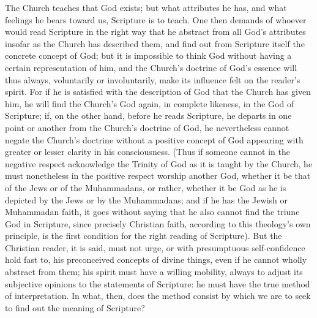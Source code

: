\documentclass[12pt]{book}
\newcommand{\opage}[1]{\marginnote{\footnotesize\textit{[#1]}}}
\begin{document}
The Church teaches that God exists; but what attributes he has, and what
feelings he bears toward us, Scripture is to teach. One then demands of whoever
would read Scripture in the right way that he abstract from all God's
attributes insofar as the Church has described them, and find out from
Scripture itself the concrete concept of God; but it is impossible to think God
without having a certain representation of him, and the Church's doctrine of
God's essence will thus always, voluntarily or involuntarily, make its
influence felt on the reader's spirit.
\opage{108} For if he is satisfied with the description of God that the Church
has given him, he will find the Church's God again, in complete likeness, in
the God of Scripture; if, on the other hand, before he reads Scripture, he
departs in one point or another from the Church's doctrine of God, he
nevertheless cannot negate the Church's doctrine without a positive concept of
God appearing with greater or lesser clarity in his consciousness. (Thus if
someone cannot in the negative respect acknowledge the Trinity of God as it is
taught by the Church, he must nonetheless in the positive respect worship
another God, whether it be that of the Jews or of the Muhammadans, or rather,
whether it be God as he is depicted by the Jews or by the Muhammadans; and if
he has the Jewish or Muhammadan faith, it goes without saying that he also
cannot find the triune God in Scripture, since precisely Christian faith,
according to this theology's own principle, is the first condition for the
right reading of Scripture). But the Christian reader, it is said, must not
urge, or with presumptuous self-confidence hold fast to, his preconceived
concepts of divine things, even if he cannot wholly abstract from them; his
spirit must have a willing mobility, always to adjust its subjective opinions
to the statements of Scripture: he must have the true method of
interpretation. In what, then, does the method consist by which we are to seek
to find out the meaning of Scripture?
\end{document}
